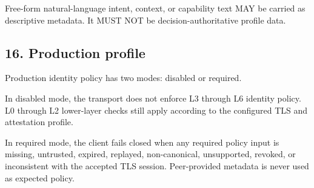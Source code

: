\documentclass[
]{article}
\begin{document}
Free-form natural-language intent, context, or capability text MAY be
carried as descriptive metadata. It MUST NOT be decision-authoritative
profile data.

\subsection{16. Production profile}\label{production-profile}

Production identity policy has two modes: disabled or required.

In disabled mode, the transport does not enforce L3 through L6 identity
policy. L0 through L2 lower-layer checks still apply according to the
configured TLS and attestation profile.

In required mode, the client fails closed when any required policy input
is missing, untrusted, expired, replayed, non-canonical, unsupported,
revoked, or inconsistent with the accepted TLS session. Peer-provided
metadata is never used as expected policy.
\end{document}
